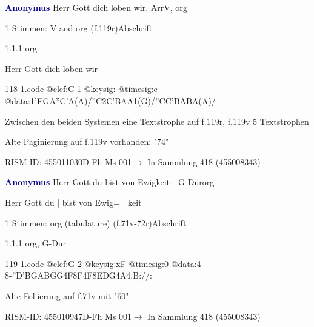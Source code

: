\documentclass[twocolumn]{book}
\begin{document}
\par \vspace{7pt} \textcolor{darkblue}{\textbf{Anonymus  }}\hfillplus{\textbf{[118]}}\newline Herr Gott dich loben wir. Arr\newline V, org
\par \begin{itshape}\end{itshape} 
\par \textcolor{darkblue}{}  1 Stimmen: V and org  (f.119r)\newline Abschrift
\par 1.1.1  org\newline \begin{footnotesize} Herr Gott dich loben wir \end{footnotesize}  
\begin{filecontents*}{118-1.code}
@clef:C-1
@keysig:
@timesig:c
@data:1'EGA''C'A(A)/''C2C'BAA1(G)/''CC'BABA(A)/
\end{filecontents*}
\newline
%
\par Zwischen den beiden Systemen eine Textstrophe auf f.119r, f.119v 5 Textstrophen
\par Alte Paginierung auf f.119v vorhanden: "74"
\par RISM-ID: 455011030\newline D-Fh  Ms 001\newline $\rightarrow$ In Sammlung 418 (455008343)
      
\par \vspace{7pt} \textcolor{darkblue}{\textbf{Anonymus  }}\hfillplus{\textbf{[119]}}\newline Herr Gott du bist von Ewigkeit - G-Dur\newline org
\par \begin{itshape}[f.71v, at left:] Herr Gott du | bist von Ewig= | keit\end{itshape} 
\par \textcolor{darkblue}{}  1 Stimmen: org (tabulature)  (f.71v-72r)\newline Abschrift
\par 1.1.1  org, G-Dur  
\begin{filecontents*}{119-1.code}
@clef:G-2
@keysig:xF
@timesig:0
@data:4-8-''D{'BGAB}{GG}4F8F4F8E{DG}4A4.B://:
\end{filecontents*}
\newline
%
\par Alte Foliierung auf f.71v mit "60"
\par RISM-ID: 455010947\newline D-Fh  Ms 001\newline $\rightarrow$ In Sammlung 418 (455008343)
      
\end{document}
